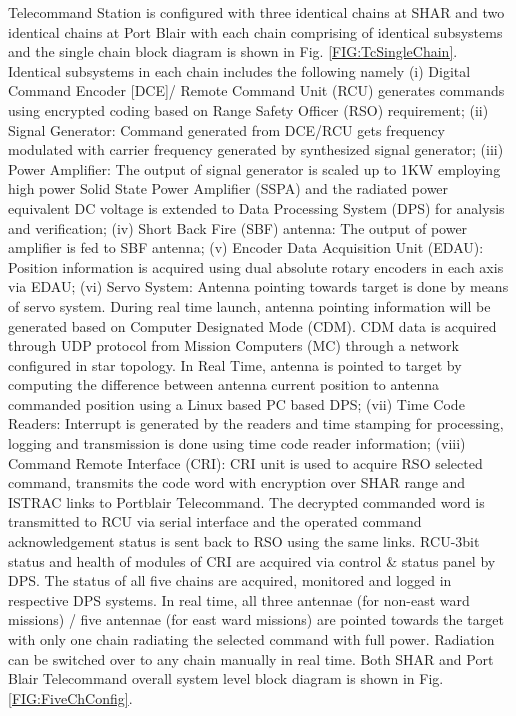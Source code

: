 Telecommand Station is configured with three identical chains at SHAR and two identical chains at Port Blair with each chain comprising of identical subsystems and the single chain block diagram is shown in Fig. \ref{FIG:TcSingleChain}. Identical subsystems in each chain includes the following namely (i) Digital Command Encoder [DCE]/ Remote Command Unit (RCU) generates commands using encrypted coding based on Range Safety Officer (RSO) requirement; (ii) Signal Generator: Command generated from DCE/RCU gets frequency modulated with carrier frequency generated by synthesized signal generator; (iii) Power Amplifier: The output of signal generator is scaled up to 1KW employing high power Solid State Power Amplifier (SSPA) and the radiated power equivalent DC voltage is extended to Data Processing System (DPS) for analysis and verification; (iv) Short Back Fire (SBF) antenna: The output of  power amplifier is fed to SBF antenna; (v) Encoder Data Acquisition Unit (EDAU): Position information is acquired using dual absolute rotary encoders in each axis via EDAU; (vi) Servo System: Antenna pointing towards target is done by means of servo system. During real time launch, antenna pointing information will be generated based on Computer Designated Mode (CDM). CDM data is acquired through UDP protocol from Mission Computers (MC) through a network configured in star topology. In Real Time, antenna is pointed to target by computing the difference between antenna current position to antenna commanded position using a Linux based PC based DPS; (vii) Time Code Readers: Interrupt is generated by the readers and time stamping for processing, logging and transmission is done using time code reader information; (viii) Command Remote Interface (CRI):  CRI unit is used to acquire RSO selected command, transmits the code word with encryption over SHAR range and ISTRAC links to Portblair Telecommand. The decrypted commanded word is transmitted to RCU via serial interface and the operated command acknowledgement status is sent back to RSO using the same links. RCU-3bit status and health of modules of CRI are acquired via control \& status panel by DPS.  The status of all five chains are acquired, monitored and logged in respective DPS systems. In real time, all three antennae (for non-east ward missions) / five antennae (for east ward missions) are pointed towards the target with only one chain radiating the selected command with full power. Radiation can be switched over to any chain manually in real time. Both SHAR and Port Blair Telecommand overall system level block diagram is shown in Fig.\ref{FIG:FiveChConfig}.

